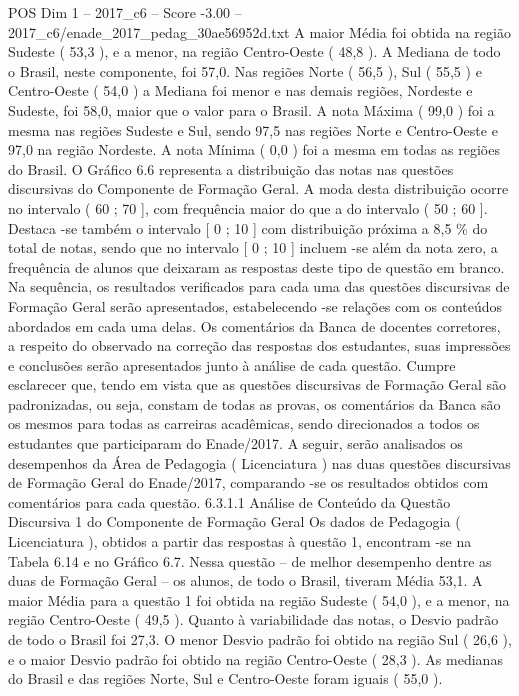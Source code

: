 \begin{textsample}{POS Dim 1 – 2017\_c6 – Score -3.00 – 2017\_c6/enade\_2017\_pedag\_30ae56952d.txt}
A maior Média foi obtida na região Sudeste ( 53,3 ), e a menor, na região Centro-Oeste ( 48,8 ).
A Mediana de todo o Brasil, neste componente, foi 57,0.
Nas regiões Norte ( 56,5 ), Sul ( 55,5 ) e Centro-Oeste ( 54,0 ) a Mediana foi menor e nas demais regiões, Nordeste e Sudeste, foi 58,0, maior que o valor para o Brasil.
A nota Máxima ( 99,0 ) foi a mesma nas regiões Sudeste e Sul, sendo 97,5 nas regiões Norte e Centro-Oeste e 97,0 na região Nordeste.
A nota Mínima ( 0,0 ) foi a mesma em todas as regiões do Brasil.
O Gráfico 6.6 representa a distribuição das notas nas questões discursivas do Componente de Formação Geral.
A moda desta distribuição ocorre no intervalo ( 60 ; 70 ], com frequência maior do que a do intervalo ( 50 ; 60 ].
Destaca -se também o intervalo [ 0 ; 10 ] com distribuição próxima a 8,5 \% do total de notas, sendo que no intervalo [ 0 ; 10 ] incluem -se além da nota zero, a frequência de alunos que deixaram as respostas deste tipo de questão em branco.
Na sequência, os resultados verificados para cada uma das questões discursivas de Formação Geral serão apresentados, estabelecendo -se relações com os conteúdos abordados em cada uma delas.
Os comentários da Banca de docentes corretores, a respeito do observado na correção das respostas dos estudantes, suas impressões e conclusões serão apresentados junto à análise de cada questão.
Cumpre esclarecer que, tendo em vista que as questões discursivas de Formação Geral são padronizadas, ou seja, constam de todas as provas, os comentários da Banca são os mesmos para todas as carreiras acadêmicas, sendo direcionados a todos os estudantes que participaram do Enade/2017.
A seguir, serão analisados os desempenhos da Área de Pedagogia ( Licenciatura ) nas duas questões discursivas de Formação Geral do Enade/2017, comparando -se os resultados obtidos com comentários para cada questão. 6.3.1.1 Análise de Conteúdo da Questão Discursiva 1 do Componente de Formação Geral Os dados de Pedagogia ( Licenciatura ), obtidos a partir das respostas à questão 1, encontram -se na Tabela 6.14 e no Gráfico 6.7.
Nessa questão – de melhor desempenho dentre as duas de Formação Geral – os alunos, de todo o Brasil, tiveram Média 53,1.
A maior Média para a questão 1 foi obtida na região Sudeste ( 54,0 ), e a menor, na região Centro-Oeste ( 49,5 ).
Quanto à variabilidade das notas, o Desvio padrão de todo o Brasil foi 27,3.
O menor Desvio padrão foi obtido na região Sul ( 26,6 ), e o maior Desvio padrão foi obtido na região Centro-Oeste ( 28,3 ).
As medianas do Brasil e das regiões Norte, Sul e Centro-Oeste foram iguais ( 55,0 ).

\end{textsample}
